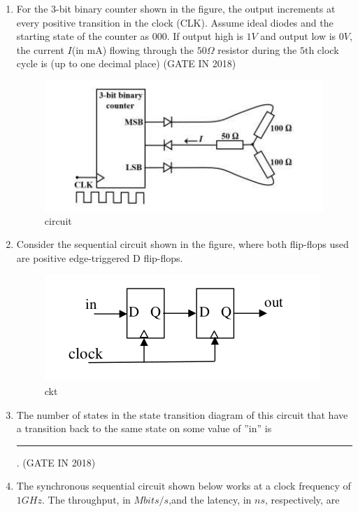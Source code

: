 \begin{enumerate}
\item  
\label{prob:gate IN 17}
For the $3$-bit binary counter shown in the figure, the output increments at every positive 
transition in the clock (CLK). Assume ideal diodes and the starting state of the counter as 
$000$. If output high is $1 V$ and output low is $0 V$, the current $I$(in mA) flowing through the 
$50 \Omega$ resistor during the $5$th clock cycle is (up to one decimal place)
\hfill(GATE IN 2018)
\begin{figure}[H]
\centering
\includegraphics[width=\columnwidth]{ide/7474/figs/pic.png}
\caption{circuit}
\label{fig:lcd}
\end{figure}
\item
\label{prob:gate CS 22}
Consider the sequential circuit shown in the figure, where both flip-flops used are positive
    edge-triggered D flip-flops.
\begin{figure}[H]
        \centering      
        \includegraphics[width=\columnwidth]{ide/7474/figs/wert.jpg}
        \caption{ckt}    
        \label{fig:wert}
    \end{figure}

    \item The number of states in the state transition diagram of this circuit that have a transition back to the same state on some value of ''in'' is \rule{30pt}{1pt}.
   \hfill(GATE IN 2018)
   \item The synchronous sequential circuit shown below works at a clock frequency of $1 GHz$. The throughput, in $Mbits/s$,and the latency, in $ns$, respectively, are 
\begin{figure}[H]
    \centering
{}
\end{figure}
\end{enumerate}
